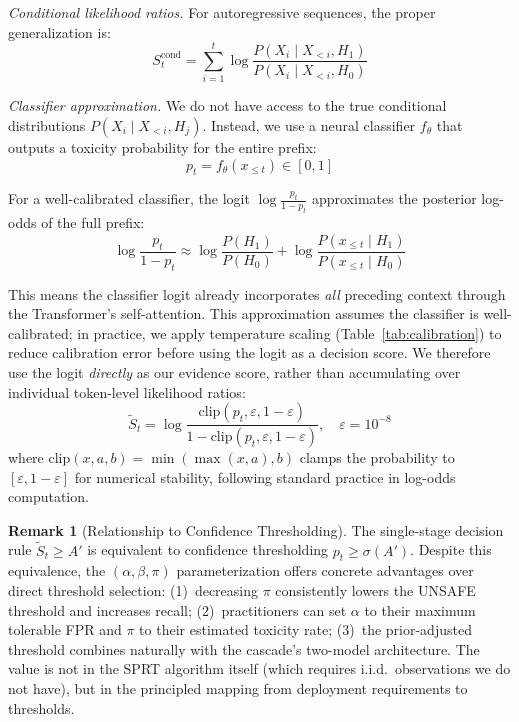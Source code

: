 \documentclass[acmtjournal, acmnowidth]{acmart}
\newcommand{\Hzero}{H_0}
\newcommand{\Hone}{H_1}
\theoremstyle{definition}
\newtheorem{remark}{Remark}[section]
\begin{document}
\textit{Conditional likelihood ratios.} For autoregressive sequences, the proper generalization is:
\begin{equation}
S_t^{\text{cond}} = \sum_{i=1}^{t} \log \frac{P(X_i \mid X_{<i}, \Hone)}{P(X_i \mid X_{<i}, \Hzero)}
\label{eq:conditional_llr}
\end{equation}

\textit{Classifier approximation.} We do not have access to the true conditional distributions $P(X_i \mid X_{<i}, H_j)$. Instead, we use a neural classifier $f_\theta$ that outputs a toxicity probability for the entire prefix:
\begin{equation}
p_t = f_\theta(x_{\leq t}) \in [0, 1]
\end{equation}

For a well-calibrated classifier, the logit $\log\frac{p_t}{1-p_t}$ approximates the posterior log-odds of the full prefix:
\begin{equation}
\log\frac{p_t}{1-p_t} \approx \log\frac{P(\Hone)}{P(\Hzero)} + \log\frac{P(x_{\leq t} \mid \Hone)}{P(x_{\leq t} \mid \Hzero)}
\label{eq:logit_approximation}
\end{equation}

This means the classifier logit already incorporates \textit{all} preceding context through the Transformer's self-attention. This approximation assumes the classifier is well-calibrated; in practice, we apply temperature scaling (Table~\ref{tab:calibration}) to reduce calibration error before using the logit as a decision score. We therefore use the logit \textit{directly} as our evidence score, rather than accumulating over individual token-level likelihood ratios:
\begin{equation}
\tilde{S}_t = \log\frac{\mathrm{clip}(p_t, \varepsilon, 1{-}\varepsilon)}{1 - \mathrm{clip}(p_t, \varepsilon, 1{-}\varepsilon)}, \quad \varepsilon = 10^{-8}
\label{eq:evidence_score}
\end{equation}
where $\mathrm{clip}(x, a, b) = \min(\max(x, a), b)$ clamps the probability to $[\varepsilon, 1{-}\varepsilon]$ for numerical stability, following standard practice in log-odds computation.

\begin{remark}[Relationship to Confidence Thresholding]
The single-stage decision rule $\tilde{S}_t \geq A'$ is equivalent to confidence thresholding $p_t \geq \sigma(A')$. Despite this equivalence, the $(\alpha, \beta, \pi)$ parameterization offers concrete advantages over direct threshold selection: (1)~decreasing $\pi$ consistently lowers the UNSAFE threshold and increases recall; (2)~practitioners can set $\alpha$ to their maximum tolerable FPR and $\pi$ to their estimated toxicity rate; (3)~the prior-adjusted threshold combines naturally with the cascade's two-model architecture. The value is not in the SPRT algorithm itself (which requires i.i.d.\ observations we do not have), but in the principled mapping from deployment requirements to thresholds.
\end{remark}
\end{document}

